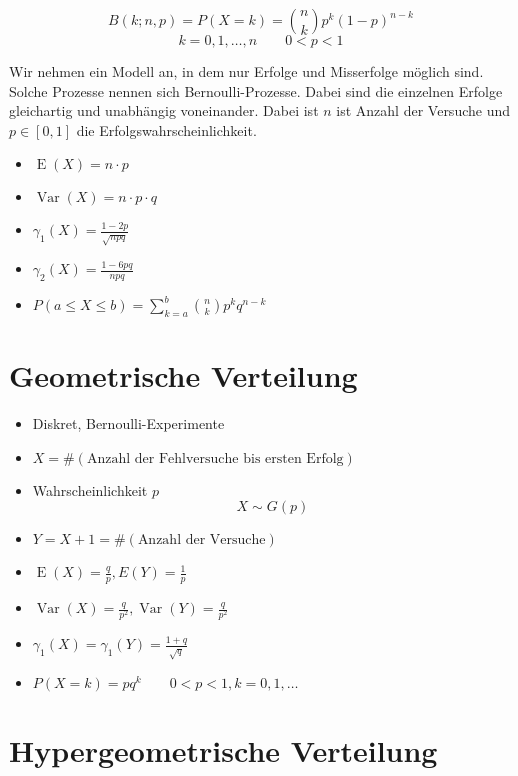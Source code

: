 \documentclass[a4paper,twocolumn]{article}
\DeclareMathOperator{\Var}{Var}
\DeclareMathOperator{\E}{E}
\begin{document}
\[
    B(k;n,p) = P(X=k) = {n \choose k} p^k (1 - p)^{n-k}
\] \[
    k = 0,1,\ldots,n \qquad 0 < p < 1
\]

Wir nehmen ein Modell an, in dem nur Erfolge und Misserfolge möglich sind.
Solche Prozesse nennen sich Bernoulli-Prozesse. Dabei sind die einzelnen
Erfolge gleichartig und unabhängig voneinander. Dabei ist $n$ ist Anzahl
der Versuche und $p \in [0,1]$ die Erfolgswahrscheinlichkeit.

\begin{itemize}
  \item $\E(X) = n\cdot p$
  \item $\Var(X) = n\cdot p\cdot q$
  \item $\gamma_1(X) = \frac{1-2p}{\sqrt{npq}}$
  \item $\gamma_2(X) = \frac{1-6pq}{npq}$
  \item $P(a\leq X\leq b) = \sum_{k=a}^b {n\choose k} p^k q^{n-k}$
\end{itemize}

\section{Geometrische Verteilung}

\begin{itemize}
  \item Diskret, Bernoulli-Experimente
  \item $X = \#(\text{Anzahl der Fehlversuche bis ersten Erfolg})$
  \item Wahrscheinlichkeit $p$
        \[
            X \sim G(p)
        \]
  \item $Y = X + 1 = \#(\text{Anzahl der Versuche})$
\end{itemize}

\begin{itemize}
  \item $\E(X) = \frac{q}{p}, E(Y) = \frac{1}{p}$
  \item $\Var(X) = \frac{q}{p^2}, \Var(Y) = \frac{q}{p^2}$
  \item $\gamma_1(X) = \gamma_1(Y) = \frac{1 + q}{\sqrt{q}}$
  \item $P(X=k) = pq^k \qquad 0 < p < 1, k = 0,1,\ldots$
\end{itemize}

\newpage

\section{Hypergeometrische Verteilung}
\end{document}
